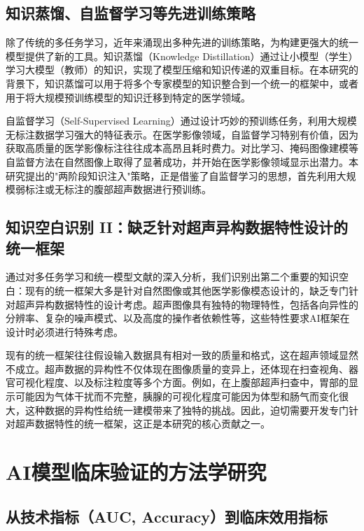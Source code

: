 \subsection{知识蒸馏、自监督学习等先进训练策略}

除了传统的多任务学习，近年来涌现出多种先进的训练策略，为构建更强大的统一模型提供了新的工具。知识蒸馏（Knowledge Distillation）通过让小模型（学生）学习大模型（教师）的知识，实现了模型压缩和知识传递的双重目标。在本研究的背景下，知识蒸馏可以用于将多个专家模型的知识整合到一个统一的框架中，或者用于将大规模预训练模型的知识迁移到特定的医学领域。

自监督学习（Self-Supervised Learning）通过设计巧妙的预训练任务，利用大规模无标注数据学习强大的特征表示。在医学影像领域，自监督学习特别有价值，因为获取高质量的医学影像标注往往成本高昂且耗时费力。对比学习、掩码图像建模等自监督方法在自然图像上取得了显著成功，并开始在医学影像领域显示出潜力。本研究提出的"两阶段知识注入"策略，正是借鉴了自监督学习的思想，首先利用大规模弱标注或无标注的腹部超声数据进行预训练。

\subsection{知识空白识别 II：缺乏针对超声异构数据特性设计的统一框架}

通过对多任务学习和统一模型文献的深入分析，我们识别出第二个重要的知识空白：现有的统一框架大多是针对自然图像或其他医学影像模态设计的，缺乏专门针对超声异构数据特性的设计考虑。超声图像具有独特的物理特性，包括各向异性的分辨率、复杂的噪声模式、以及高度的操作者依赖性等，这些特性要求AI框架在设计时必须进行特殊考虑。

现有的统一框架往往假设输入数据具有相对一致的质量和格式，这在超声领域显然不成立。超声数据的异构性不仅体现在图像质量的变异上，还体现在扫查视角、器官可视化程度、以及标注粒度等多个方面。例如，在上腹部超声扫查中，胃部的显示可能因为气体干扰而不完整，胰腺的可视化程度可能因为体型和肠气而变化很大，这种数据的异构性给统一建模带来了独特的挑战。因此，迫切需要开发专门针对超声数据特性的统一框架，这正是本研究的核心贡献之一。

\section{AI模型临床验证的方法学研究}

\subsection{从技术指标（AUC, Accuracy）到临床效用指标}

